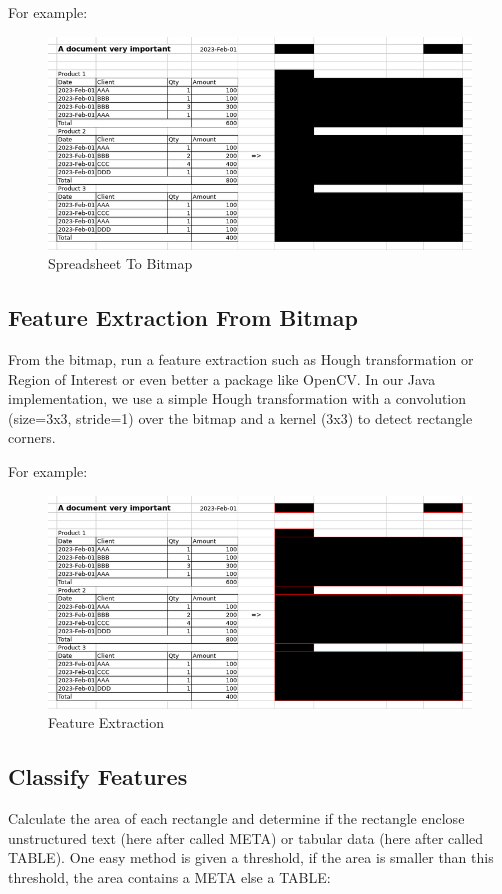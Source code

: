 \documentclass{article}
\begin{document}
For example:

\begin{figure}[H]
\caption{Spreadsheet To Bitmap}
\includegraphics[width=\columnwidth]{spreadhseet_to_bitmap}
\end{figure}

\subsection{Feature Extraction From Bitmap}
From the bitmap, run a feature extraction such as Hough transformation or Region of Interest or even better a package
like OpenCV. In our Java implementation, we use a simple Hough transformation with a convolution (size=3x3, stride=1)
over the bitmap and a kernel (3x3) to detect rectangle corners.

For example:

\begin{figure}[H]
\caption{Feature Extraction}
\includegraphics[width=\columnwidth]{feature_extraction}
\end{figure}

\subsection{Classify Features}
Calculate the area of each rectangle and determine if the rectangle enclose unstructured text (here after
called META) or tabular data (here after called TABLE). One easy method is given a threshold, if the area is smaller
than this threshold, the area contains a META else a TABLE:
\end{document}
